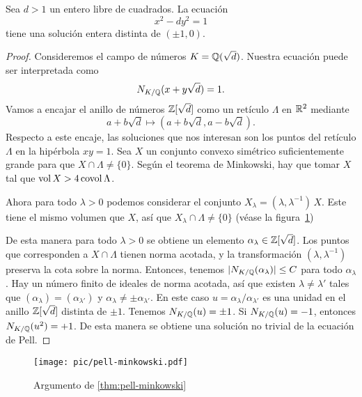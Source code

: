 \begin{teorema}
  \label{thm:pell-minkowski}
  Sea $d > 1$ un entero libre de cuadrados. La ecuación
  $$x^2 - dy^2 = 1$$
  tiene una solución entera distinta de $(\pm 1, 0)$.

  \begin{proof}
    Consideremos el campo de números $K = \mathbb{Q} (\sqrt{d})$. Nuestra ecuación
    puede ser interpretada como
    $$N_{K/\mathbb{Q}} (x + y\sqrt{d}) = 1.$$
    Vamos a encajar el anillo de números $\mathbb{Z} [\sqrt{d}]$ como un retículo
    $\Lambda$ en $\mathbb{R}^2$ mediante
    $$a + b\sqrt{d} \mapsto (a + b\sqrt{d}, a - b\sqrt{d}).$$
    Respecto a este encaje, las soluciones que nos interesan son los puntos
    del retículo $\Lambda$ en la hipérbola $xy = 1$. Sea $X$ un conjunto
    convexo simétrico suficientemente grande para que
    $X \cap \Lambda \ne \{ 0 \}$. Según el teorema de Minkowski, hay que
    tomar $X$ tal que $\operatorname{vol} X > 4 \operatorname{covol} \Lambda$.

    Ahora para todo $\lambda > 0$ podemos considerar el conjunto
    $X_\lambda = (\lambda, \lambda^{-1})\,X$. Este tiene el mismo volumen que
    $X$, así que $X_\lambda \cap \Lambda \ne \{ 0 \}$
    (véase la figura~\ref{fig:pell-minkowski})

    De esta manera para todo $\lambda > 0$ se obtiene un elemento
    $\alpha_\lambda \in \mathbb{Z} [\sqrt{d}]$. Los puntos que corresponden a
    $X \cap \Lambda$ tienen norma acotada, y la transformación
    $(\lambda, \lambda^{-1})$ preserva la cota sobre la norma. Entonces,
    tenemos $|N_{K/\mathbb{Q}} (\alpha_\lambda)| \le C$ para todo $\alpha_\lambda$.
    Hay un número finito de ideales de norma acotada, así que existen
    $\lambda \ne \lambda'$ tales que $(\alpha_\lambda) = (\alpha_{\lambda'})$
    y $\alpha_\lambda \ne \pm\alpha_{\lambda'}$. En este caso
    $u = \alpha_\lambda/\alpha_{\lambda'}$ es una unidad en el anillo
    $\mathbb{Z} [\sqrt{d}]$ distinta de $\pm 1$. Tenemos $N_{K/\mathbb{Q}} (u) = \pm 1$.
    Si $N_{K/\mathbb{Q}} (u) = -1$, entonces $N_{K/\mathbb{Q}} (u^2) = +1$. De esta manera
    se obtiene una solución no trivial de la ecuación de Pell.
  \end{proof}
\end{teorema}

\begin{figure}
  \begin{center}
    \texttt{[image: pic/pell-minkowski.pdf]}
  \end{center}

  \caption{Argumento de \ref{thm:pell-minkowski}}
  \label{fig:pell-minkowski}
\end{figure}

